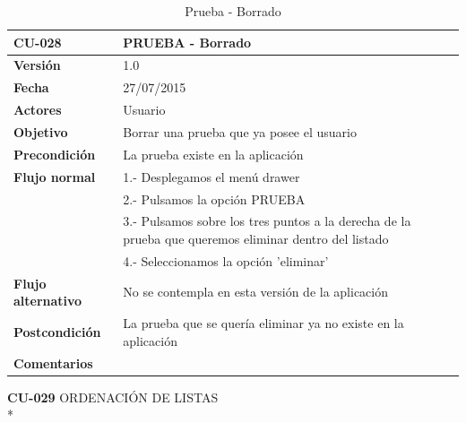 \documentclass[../pfc.tex]{subfiles}
\begin{document}
	\begin{table}[H]
		\centering
		\begin{tabular}[t]{|p{3cm}|p{9.5cm}|}
			\hline \textbf{CU-028} & \textbf{PRUEBA - Borrado} \\*
			\hline\hline \textbf{Versión} & 1.0 \\*
			\hline\hline \textbf{Fecha} & 27/07/2015 \\*
			\hline\textbf{Actores} 	& Usuario\\*
			\hline \textbf{Objetivo} & Borrar una prueba que ya posee el usuario\\* 			
			\hline \textbf{Precondición} & La prueba existe en la aplicación\\* 
			\hline \textbf{Flujo normal} & 1.- Desplegamos el menú drawer \\* 
			& 2.- Pulsamos la opción PRUEBA\\*	
			& 3.- Pulsamos sobre los tres puntos a la derecha de la prueba que queremos eliminar dentro del listado\\*	
			& 4.- Seleccionamos la opción 'eliminar'\\*	
			\hline \textbf{Flujo alternativo} & No se contempla en esta versión de la aplicación \\* 
			\hline \textbf{Postcondición} & La prueba que se quería eliminar ya no existe en la aplicación \\* 
			\hline \textbf{Comentarios}   & \\*
			\hline
		\end{tabular}
		\caption{Prueba - Borrado}
		\label{tabla:caso028}
	\end{table}

	
	
	\textbf{CU-029}	ORDENACIÓN DE LISTAS\\* 
	
\end{document}
